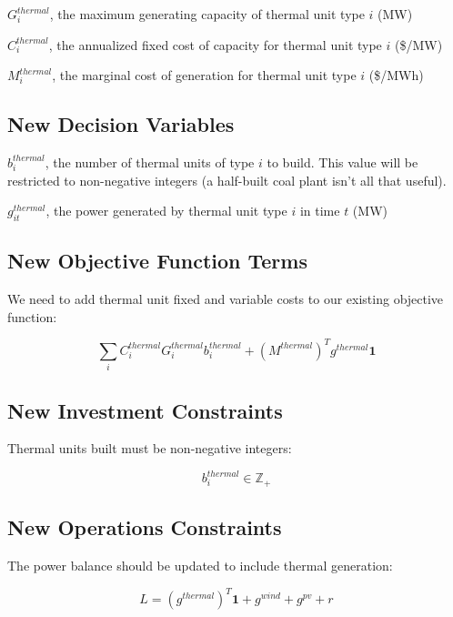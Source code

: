 \documentclass[11pt]{article}
\begin{document}
$G^{thermal}_i$, the maximum generating capacity of thermal unit type $i$ (MW)

$C^{thermal}_i$, the annualized fixed cost of capacity for thermal unit type $i$ (\$/MW)

$M^{thermal}_i$, the marginal cost of generation for thermal unit type $i$ (\$/MWh)

\subsection{New Decision Variables}

$b^{thermal}_i$, the number of thermal units of type $i$ to build. This value will be restricted to non-negative integers (a half-built coal plant isn't all that useful).

$g^{thermal}_{it}$, the power generated by thermal unit type $i$ in time $t$ (MW)

\subsection{New Objective Function Terms}

We need to add thermal unit fixed and variable costs to our existing objective function:

\begin{equation}
	\sum_i C^{thermal}_i G^{thermal}_i b^{thermal}_i + (M^{thermal})^T g^{thermal} \mathbf{1} 
\end{equation}

\subsection{New Investment Constraints}

Thermal units built must be non-negative integers:

\begin{equation}
	b^{thermal}_i \in \mathbb{Z}_+
\end{equation}

\subsection{New Operations Constraints}

The power balance should be updated to include thermal generation:

\begin{equation}
	L = (g^{thermal})^T \textbf{1} + g^{wind} + g^{pv} + r
\end{equation}
\end{document}
